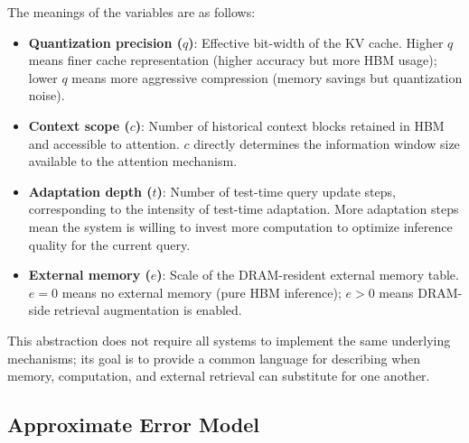 \documentclass[11pt,a4paper]{article}
\theoremstyle{plain}
\theoremstyle{definition}
\begin{document}
The meanings of the variables are as follows:
\begin{itemize}
    \item \textbf{Quantization precision ($q$)}: Effective bit-width of the KV cache. Higher $q$ means finer cache representation (higher accuracy but more HBM usage); lower $q$ means more aggressive compression (memory savings but quantization noise).
    \item \textbf{Context scope ($c$)}: Number of historical context blocks retained in HBM and accessible to attention. $c$ directly determines the information window size available to the attention mechanism.
    \item \textbf{Adaptation depth ($t$)}: Number of test-time query update steps, corresponding to the intensity of test-time adaptation. More adaptation steps mean the system is willing to invest more computation to optimize inference quality for the current query.
    \item \textbf{External memory ($e$)}: Scale of the DRAM-resident external memory table. $e=0$ means no external memory (pure HBM inference); $e>0$ means DRAM-side retrieval augmentation is enabled.
\end{itemize}

This abstraction does not require all systems to implement the same underlying mechanisms; its goal is to provide a common language for describing when memory, computation, and external retrieval can substitute for one another.

\subsection{Approximate Error Model}
\end{document}
